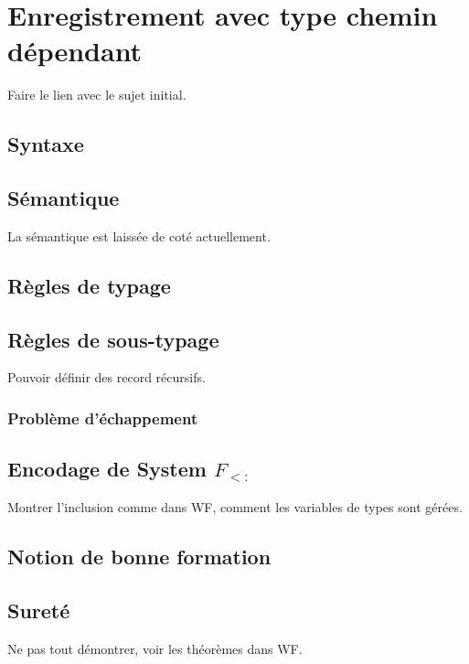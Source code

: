 \chapter{Enregistrement avec type chemin dépendant}

Faire le lien avec le sujet initial.

\section{Syntaxe}

\section{Sémantique}

La sémantique est laissée de coté actuellement.

\section{Règles de typage}

\section{Règles de sous-typage}

Pouvoir définir des record récursifs.

\subsection*{Problème d'échappement}

\section{Encodage de System $F_{<:}$}

Montrer l'inclusion comme dans WF, comment les variables de types sont gérées.

\section{Notion de bonne formation}


\section{Sureté}

Ne pas tout démontrer, voir les théorèmes dans WF.